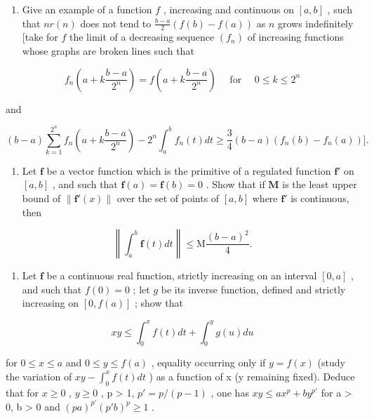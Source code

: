\begin{enumerate}
\def\labelenumi{\alph{enumi})}
\setcounter{enumi}{2}
\tightlist
\item
  Give an example of a function \(f\) , increasing and continuous on \([a, b]\) , such that \(nr(n)\) does not tend to \(\frac{b - a}{2} (f(b) - f(a))\) as \(n\) grows indefinitely {[}take for \(f\) the limit of a decreasing sequence \((f_n)\) of increasing functions whose graphs are broken lines such that
\end{enumerate}

\[
f _ {n} \left(a + k \frac {b - a}{2 ^ {n}}\right) = f \left(a + k \frac {b - a}{2 ^ {n}}\right) \quad \text { for } \quad 0 \leqslant k \leqslant 2 ^ {n}
\]

and

\[
(b - a) \sum_ {k = 1} ^ {2 ^ {n}} f _ {n} \left(a + k \frac {b - a}{2 ^ {n}}\right) - 2 ^ {n} \int_ {a} ^ {b} f _ {n} (t) d t \geqslant \frac {3}{4} (b - a) \left(f _ {n} (b) - f _ {n} (a)\right) \Biggr ].
\]

\begin{enumerate}
\def\labelenumi{\arabic{enumi})}
\setcounter{enumi}{13}
\tightlist
\item
  Let \(\mathbf{f}\) be a vector function which is the primitive of a regulated function \(\mathbf{f}'\) on \([a, b]\) , and such that \(\mathbf{f}(a) = \mathbf{f}(b) = 0\) . Show that if \(\mathbf{M}\) is the least upper bound of \(\| \mathbf{f}'(x)\|\) over the set of points of \([a, b]\) where \(\mathbf{f}'\) is continuous, then
\end{enumerate}

\[
\left\| \int_ {a} ^ {b} \mathbf {f} (t) d t \right\| \leqslant \mathrm{M} \frac {(b - a) ^ {2}}{4}.
\]

\begin{enumerate}
\def\labelenumi{\arabic{enumi})}
\setcounter{enumi}{14}
\tightlist
\item
  Let \(\mathbf{f}\) be a continuous real function, strictly increasing on an interval \([0, a]\) , and such that \(f(0) = 0\) ; let \(g\) be its inverse function, defined and strictly increasing on \([0, f(a)]\) ; show that
\end{enumerate}

\[
x y \leqslant \int_ {0} ^ {x} f (t) d t + \int_ {0} ^ {y} g (u) d u
\]

for \(0 \leqslant x \leqslant a\) and \(0 \leqslant y \leqslant f(a)\) , equality occurring only if \(y = f(x)\) (study the variation of \(xy - \int_{0}^{x} f(t) dt\) ) as a function of x (y remaining fixed). Deduce that for \(x \geqslant 0\) , \(y \geqslant 0\) , p \textgreater{} 1, \(p' = p/(p - 1)\) , one has \(xy \leqslant ax^{p} + by^{p'}\) for a \textgreater{} 0, b \textgreater{} 0 and \((pa)^{p'}(p'b)^{p} \geqslant 1\) .

